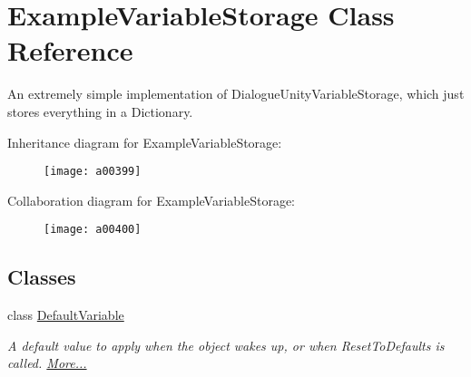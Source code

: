\hypertarget{a00091}{\section{Example\-Variable\-Storage Class Reference}
\label{a00091}
}


An extremely simple implementation of Dialogue\-Unity\-Variable\-Storage, which just stores everything in a Dictionary.  




Inheritance diagram for Example\-Variable\-Storage\-:
\nopagebreak
\begin{figure}[H]
\begin{center}
\leavevmode
\texttt{[image: a00399]}
\end{center}
\end{figure}


Collaboration diagram for Example\-Variable\-Storage\-:
\nopagebreak
\begin{figure}[H]
\begin{center}
\leavevmode
\texttt{[image: a00400]}
\end{center}
\end{figure}
\subsection*{Classes}
\begin{DoxyCompactItemize}
\item 
class \hyperlink{a00091_a00379}{Default\-Variable}
\begin{DoxyCompactList}\small\item\em A default value to apply when the object wakes up, or when Reset\-To\-Defaults is called.  \hyperlink{a00091_a00379}{More...}\end{DoxyCompactList}\end{DoxyCompactItemize}
